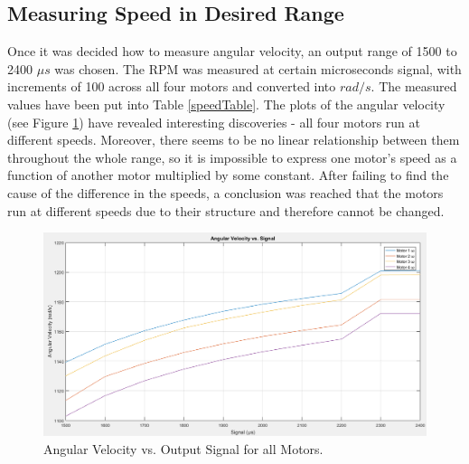 \subsection{Measuring Speed in Desired Range}
Once it was decided how to measure angular velocity, an output range of 1500 to 2400 $\mu s$ was chosen. The RPM was measured at certain microseconds signal, with increments of 100 across all four motors and converted into $rad/s$. The measured values have been put into Table \ref{speedTable}.
The plots of the angular velocity (see Figure \ref{radsPlots}) have revealed interesting discoveries - all four motors run at different speeds. Moreover, there seems to be no linear relationship between them throughout the whole range, so it is impossible to express one motor's speed as a function of another motor multiplied by some constant. After failing to find the cause of the difference in the speeds, a conclusion was reached that the motors run at different speeds due to their structure and therefore cannot be changed.

\begin{figure}[H]
  \centering
    \includegraphics[width=1\textwidth]{images/radsPlots.png}
	\caption{Angular Velocity vs. Output Signal for all Motors.}
	\label{radsPlots}
\end{figure}

